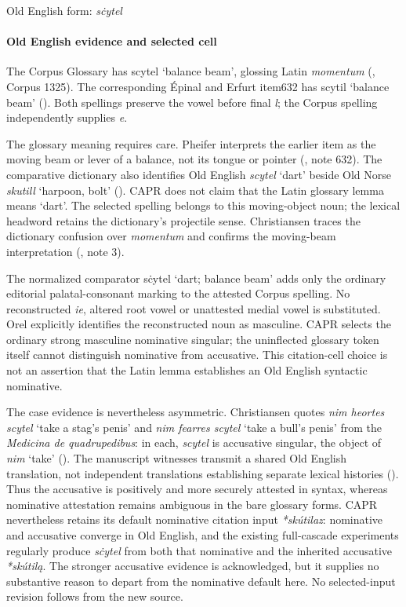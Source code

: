 \documentclass[
  british,
  a4paper,
]{article}
\begin{document}
Old English form: \emph{sċytel}

\paragraph{Old English evidence and selected
cell}\label{old-english-evidence-and-selected-cell}

The Corpus Glossary has {scytel} `balance beam', glossing Latin
\emph{momentum} (, Corpus 1325).
The corresponding Épinal and Erfurt item632 has {scytil} `balance beam'
(). Both spellings preserve
the vowel before final \emph{l}; the Corpus spelling independently
supplies \emph{e}.

The glossary meaning requires care. Pheifer interprets the earlier item
as the moving beam or lever of a balance, not its tongue or pointer
(, note 632). The
comparative dictionary also identifies Old English \emph{scytel} `dart'
beside Old Norse \emph{skutill} `harpoon, bolt'
(). CAPR does not claim that
the Latin glossary lemma means `dart'. The selected spelling belongs to
this moving-object noun; the lexical headword retains the dictionary's
projectile sense. Christiansen traces the dictionary confusion over
\emph{momentum} and confirms the moving-beam interpretation
(, note 3).

The normalized comparator {sċytel} `dart; balance beam' adds only the
ordinary editorial palatal-consonant marking to the attested Corpus
spelling. No reconstructed \emph{ie}, altered root vowel or unattested
medial vowel is substituted. Orel explicitly identifies the
reconstructed noun as masculine. CAPR selects the ordinary strong
masculine nominative singular; the uninflected glossary token itself
cannot distinguish nominative from accusative. This citation-cell choice
is not an assertion that the Latin lemma establishes an Old English
syntactic nominative.

The case evidence is nevertheless asymmetric. Christiansen quotes
\emph{nim heortes scytel} `take a stag's penis' and \emph{nim fearres
scytel} `take a bull's penis' from the \emph{Medicina de quadrupedibus}:
in each, \emph{scytel} is accusative singular, the object of \emph{nim}
`take' ().
The manuscript witnesses transmit a shared Old English translation, not
independent translations establishing separate lexical histories
(). Thus the
accusative is positively and more securely attested in syntax, whereas
nominative attestation remains ambiguous in the bare glossary forms.
CAPR nevertheless retains its default nominative citation input
\emph{*skútilaz}: nominative and accusative converge in Old English, and
the existing full-cascade experiments regularly produce \emph{sċytel}
from both that nominative and the inherited accusative \emph{*skútilą}.
The stronger accusative evidence is acknowledged, but it supplies no
substantive reason to depart from the nominative default here. No
selected-input revision follows from the new source.
\end{document}
